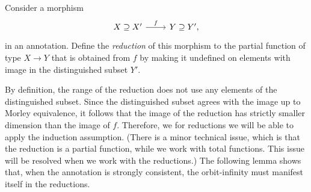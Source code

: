 \begin{definition}
    [Reduction] Consider a morphism 
  \[
        \begin{tikzcd}
        X \supseteq X' \ar[r, "f"] & Y \supseteq Y',
        \end{tikzcd}
        \]
in an annotation. Define the \emph{reduction} of this morphism to  the partial function of type $X \to Y$ that is obtained from $f$ by making it undefined on elements with image in the distinguished subset $Y'$. 
\end{definition}
By definition, the range of the reduction does not use any elements of the distinguished subset. Since the distinguished subset agrees with the image up to Morley equivalence, it follows that the image of the reduction  has strictly smaller dimension than the image of $f$.  Therefore, we for reductions we will be able to apply the induction assumption. (There is a minor technical issue, which is that the reduction is a partial function, while we work with total functions. This issue will be resolved when we work with the reductions.) The following lemma shows that, when the annotation is strongly consistent, the orbit-infinity must manifest itself in the reductions. 

